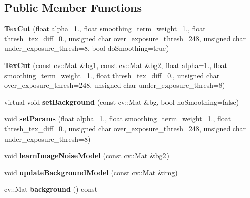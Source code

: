 \subsection*{Public Member Functions}
\begin{DoxyCompactItemize}
\item 
\hypertarget{classskl_1_1_tex_cut_ab730801cda6ac254bf925fea10844e69}{}\label{classskl_1_1_tex_cut_ab730801cda6ac254bf925fea10844e69} 
{\bfseries Tex\+Cut} (float alpha=1., float smoothing\+\_\+term\+\_\+weight=1., float thresh\+\_\+tex\+\_\+diff=0., unsigned char over\+\_\+exposure\+\_\+thresh=248, unsigned char under\+\_\+exposure\+\_\+thresh=8, bool do\+Smoothing=true)
\item 
\hypertarget{classskl_1_1_tex_cut_a0aab9407bd5cf2a5d185ce3c42ccdf23}{}\label{classskl_1_1_tex_cut_a0aab9407bd5cf2a5d185ce3c42ccdf23} 
{\bfseries Tex\+Cut} (const cv\+::\+Mat \&bg1, const cv\+::\+Mat \&bg2, float alpha=1., float smoothing\+\_\+term\+\_\+weight=1., float thresh\+\_\+tex\+\_\+diff=0., unsigned char over\+\_\+exposure\+\_\+thresh=248, unsigned char under\+\_\+exposure\+\_\+thresh=8)
\item 
\hypertarget{classskl_1_1_tex_cut_afb6fbae7b1c1da054ab43107d8097263}{}\label{classskl_1_1_tex_cut_afb6fbae7b1c1da054ab43107d8097263} 
virtual void {\bfseries set\+Background} (const cv\+::\+Mat \&bg, bool no\+Smoothing=false)
\item 
\hypertarget{classskl_1_1_tex_cut_afbeb0cf8c109b9dd062a354b848ed86c}{}\label{classskl_1_1_tex_cut_afbeb0cf8c109b9dd062a354b848ed86c} 
void {\bfseries set\+Params} (float alpha=1., float smoothing\+\_\+term\+\_\+weight=1., float thresh\+\_\+tex\+\_\+diff=0., unsigned char over\+\_\+exposure\+\_\+thresh=248, unsigned char under\+\_\+exposure\+\_\+thresh=8)
\item 
\hypertarget{classskl_1_1_tex_cut_a1ad3f55b9aaede0b857a1c3f07397235}{}\label{classskl_1_1_tex_cut_a1ad3f55b9aaede0b857a1c3f07397235} 
void {\bfseries learn\+Image\+Noise\+Model} (const cv\+::\+Mat \&bg2)
\item 
\hypertarget{classskl_1_1_tex_cut_a13d0d07100c358dc72a44c3ed1cb41c0}{}\label{classskl_1_1_tex_cut_a13d0d07100c358dc72a44c3ed1cb41c0} 
void {\bfseries update\+Background\+Model} (const cv\+::\+Mat \&img)
\item 
\hypertarget{classskl_1_1_tex_cut_ada0f475c006b236325e201fcbb9dbbe4}{}\label{classskl_1_1_tex_cut_ada0f475c006b236325e201fcbb9dbbe4} 
cv\+::\+Mat {\bfseries background} () const
\item 

\end{DoxyCompactItemize}
